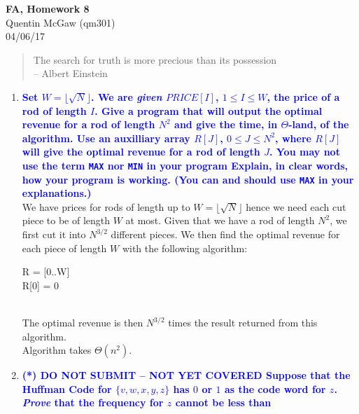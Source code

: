 \documentclass[11pt]{article}
\begin{document}
\begin{center} {\Large\bf FA, Homework 8} \\ Quentin McGaw (qm301) \\ 04/06/17
\end{center}

\begin{quote}
The search for truth is more precious than its possession
\\ --  Albert Einstein
\end{quote}

\begin{enumerate}
\item \textbf{\textcolor{blue}{Set $W=\lfloor{\sqrt{N}}\rfloor$.  
We are {\em given} $PRICE[I]$, $1\leq I\leq W$, the price of a rod of length $I$. 
Give a program that will output the optimal revenue for a rod of length $N^2$ 
and give the time, in $\Theta$-land,  of the algorithm.
Use an auxilliary array $R[J]$, $0\leq J\leq N^2$, where $R[J]$ will give the
optimal revenue for a rod of length $J$.  You may {\bf not} use
the term {\tt MAX} nor {\tt MIN} in your program  Explain, in clear words, how your program is working.
(You can and should use {\tt MAX} in your explanations.)}}
    \\ We have prices for rods of length up to $W=\lfloor{\sqrt{N}}\rfloor$ hence we need each cut piece to be of 
    length $W$ at most. Given that we have a rod of length $N^2$, we first cut it into $N^{3/2}$ different pieces.
    We then find the optimal revenue for each piece of length $W$ with the following algorithm:
    \begin{algorithm}[H]
        R = [0..W] \\
        R[0] = 0 \\
    \end{algorithm}
    \\ The optimal revenue is then $N^{3/2}$ times the result returned from this algorithm.
    \\ Algorithm takes $\Theta(n^2)$.
\item  \textbf{\textcolor{blue}{(*) {\bf DO NOT SUBMIT -- NOT YET COVERED}
Suppose that the Huffman Code for $\{v,w,x,y,z\}$ has $0$ or $1$ as the
code word for $z$.  {\em Prove} that the frequency for $z$ cannot be less than
}}
\end{enumerate}
\end{document}
